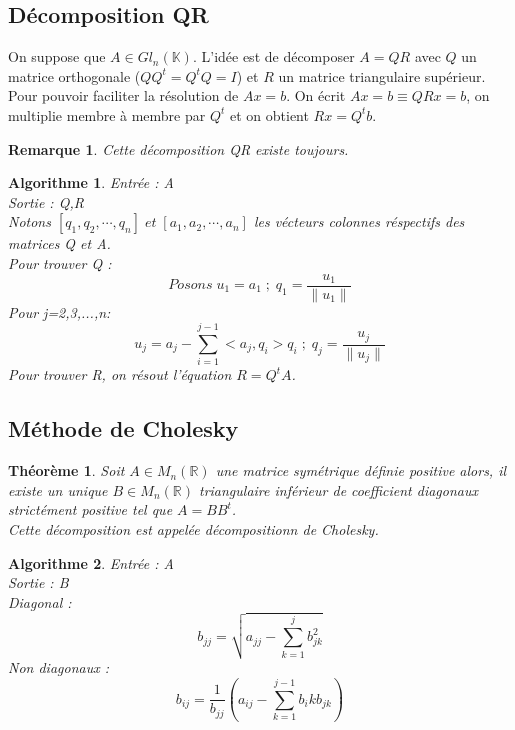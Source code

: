 \documentclass[a4paper, 12pt, french]{article}
\theoremstyle{break}
\newtheorem{rema}[defin]{Remarque}
\newtheorem{theo}[defin]{Théorème}
\newtheorem{algo}{Algorithme}
\begin{document}
\begin{center}\section{Décomposition QR}\end{center}
On suppose que $A \in Gl_{n}(\mathbb{K})$. 
L'idée est de décomposer $A=QR$ avec $\mathit{Q}$ un matrice orthogonale ($QQ^{t}=Q^{t}Q=I$) et $\mathit{R}$ un matrice triangulaire supérieur.
Pour pouvoir faciliter la résolution de $Ax=b$. On écrit $Ax=b \equiv QRx=b$, on multiplie membre à membre par $Q^{t}$ et on obtient $Rx=Q^{t}b$.\\
\begin{rema}
    Cette décomposition QR existe toujours.
\end{rema}
\begin{algo}
Entrée : A \\
Sortie : Q,R \\
Notons $[q_{1},q_{2},\cdots,q_{n}] \; et \; [a_{1},a_{2},\cdots,a_{n}]$ les vécteurs colonnes réspectifs des matrices Q et A.\\
Pour trouver Q : $$ Posons \; u_{1}=a_{1} \; ; \; q_{1}=\frac{u_{1}}{\|u_{1}\|}$$
Pour j=2,3,...,n: $$u_{j} = a_{j} - \sum_{i=1}^{j-1}<a_{j},q_{i}>q_{i} \; ; \; q_{j}=\frac{u_{j}}{\|u_{j}\|}$$
Pour trouver R, on résout l'équation $R=Q^{t}A$.
\end{algo}

\begin{center}\section{Méthode de Cholesky}\end{center}
\begin{theo}
    Soit $A \in M_{n}(\mathbb{R})$ une matrice symétrique définie positive alors, il existe un unique $B \in M_{n}(\mathbb{R})$ triangulaire inférieur de coefficient diagonaux strictément positive tel que $A=BB^{t}$.\\
    Cette décomposition est appelée décompositionn de Cholesky.
\end{theo}
\begin{algo}
	Entrée : A \\
	Sortie : B \\
	Diagonal :  $$b_{jj}=\sqrt{a_{jj}-\sum_{k=1}^{j}b_{jk}^{2}}$$
	Non diagonaux : $$ b_{ij} = \frac{1}{b_{jj}}(a_{ij} - \sum_{k=1}^{j-1}b_{i}{k}b_{jk})$$
\end{algo}
\end{document}
